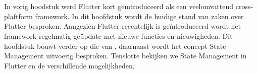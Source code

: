 \chapter{}
\label{ch:stand-van-zaken}



%
%

In vorig hoodstuk werd Flutter kort geïntroduceerd als een veelomvattend cross-plaftform framework. In dit hoofdstuk wordt de huidige stand van zaken over Flutter besproken. Aangezien Flutter recentelijk is geïntroduceerd wordt het framework regelmatig geüpdate met nieuwe functies en nieuwigheden. Dit hoofdstuk bouwt verder op die van \autocite{Coninck2019}, daarnaast wordt het concept State Management uitvoerig besproken. Tenslotte bekijken we State Management in Flutter en de verschillende mogelijkheden. 
\newline

